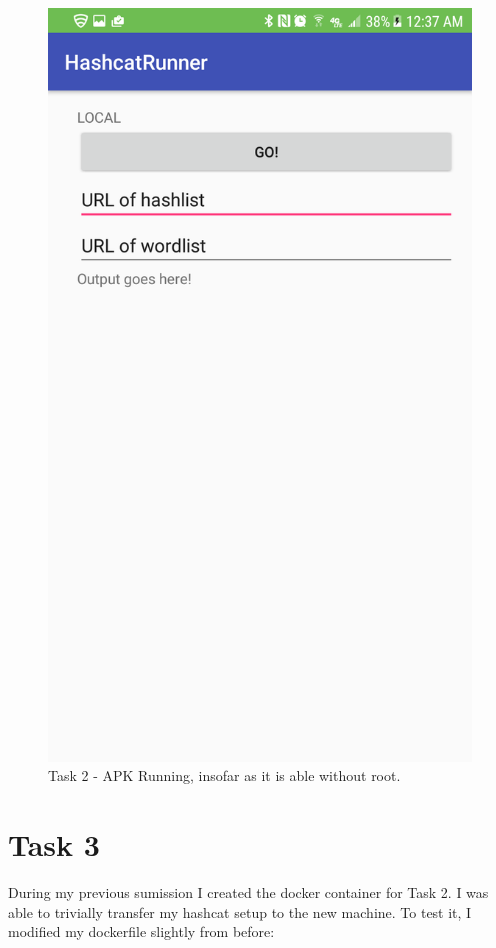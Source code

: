\documentclass{article}
\begin{document}
	\begin{figure}[ht]
        \centerline{
            \includegraphics[width=7.5in]{img/t2s1.png}
        }
		\centering
		\caption{Task 2 - APK Running, insofar as it is able without root.}
	\end{figure}


\section{Task 3}
During my previous sumission I created the docker container for Task 2. I was able to trivially transfer my hashcat setup to the new machine.
To test it, I modified my dockerfile slightly from before:
\end{document}
